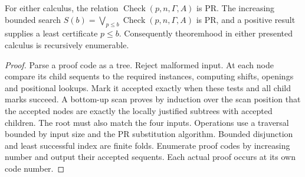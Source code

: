 \begin{theorem}\label{thm:proofcheck}
For either calculus, the relation $\operatorname{Check}(p,n,\Gamma,A)$
is PR. The increasing bounded search
$S(b)=\bigvee_{p\le b}\operatorname{Check}(p,n,\Gamma,A)$ is PR,
and a positive result supplies a least certificate $p\le b$.
Consequently theoremhood in either presented calculus is recursively
enumerable.
\end{theorem}
\begin{proof}
Parse a proof code as a tree. Reject malformed input. At each node compare
its child sequents to the required instances, computing shifts, openings
and positional lookups. Mark it accepted exactly when these tests and
all child marks succeed. A bottom-up scan proves by induction over the
scan position that the accepted nodes are exactly the locally justified
subtrees with accepted children. The root must also match the four inputs.
Operations use a traversal bounded by input size and the PR substitution
algorithm. Bounded disjunction and least successful index are finite
folds. Enumerate proof codes by increasing number and output their
accepted sequents. Each actual proof occurs at its own code number.
\end{proof}

